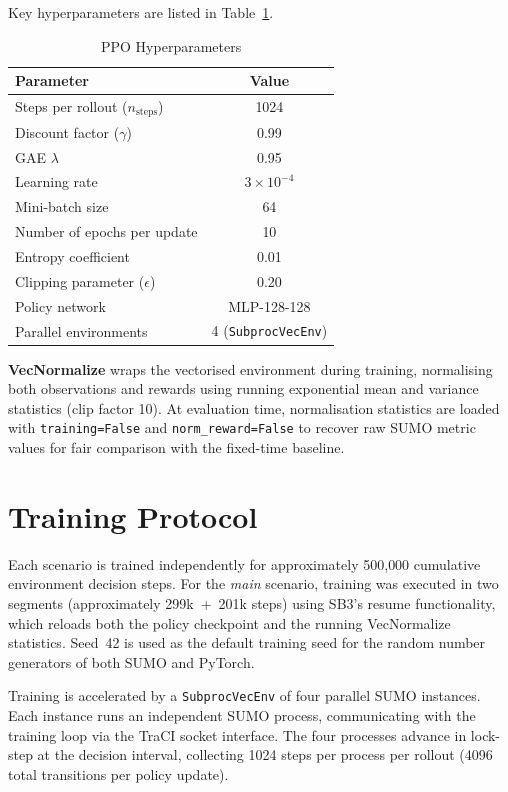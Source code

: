 \documentclass[12pt,oneside,a4paper]{report}
\begin{document}
Key hyperparameters are listed in Table~\ref{tab:hparams}.

\begin{table}[H]
\centering
\caption{PPO Hyperparameters}
\label{tab:hparams}
\begin{tabular}{lc}
\toprule
\textbf{Parameter} & \textbf{Value} \\
\midrule
Steps per rollout ($n_\text{steps}$) & 1024 \\
Discount factor ($\gamma$)           & 0.99 \\
GAE $\lambda$                        & 0.95 \\
Learning rate                        & $3 \times 10^{-4}$ \\
Mini-batch size                      & 64 \\
Number of epochs per update          & 10 \\
Entropy coefficient                  & 0.01 \\
Clipping parameter ($\epsilon$)      & 0.20 \\
Policy network                       & MLP-128-128 \\
Parallel environments                & 4 (\texttt{SubprocVecEnv}) \\
\bottomrule
\end{tabular}
\end{table}

\textbf{VecNormalize} wraps the vectorised environment during
training, normalising both observations and rewards using running
exponential mean and variance statistics (clip factor 10).  At
evaluation time, normalisation statistics are loaded with
\texttt{training=False} and \texttt{norm\_reward=False} to recover
raw SUMO metric values for fair comparison with the fixed-time
baseline.

\section{Training Protocol}
\label{sec:training}

Each scenario is trained independently for approximately
500{,}000 cumulative environment decision steps.  For the
\textit{main} scenario, training was executed in two segments
(approximately 299k~+~201k steps) using SB3's resume functionality,
which reloads both the policy checkpoint and the running
VecNormalize statistics.  Seed~42 is used as the default training
seed for the random number generators of both SUMO and PyTorch.

Training is accelerated by a \texttt{SubprocVecEnv} of four
parallel SUMO instances.  Each instance runs an independent SUMO
process, communicating with the training loop via the TraCI socket
interface.  The four processes advance in lock-step at the decision
interval, collecting 1024 steps per process per rollout (4096
total transitions per policy update).
\end{document}
